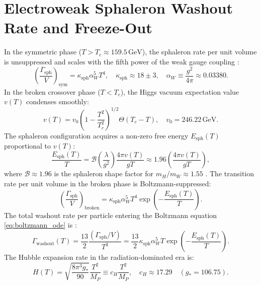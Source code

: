 \documentclass[11pt,a4paper]{article}
\begin{document}
\section{Electroweak Sphaleron Washout Rate and Freeze-Out}

In the symmetric phase ($T > T_c \approx 159.5\,\mathrm{GeV}$), the sphaleron rate per unit volume is unsuppressed and scales with the fifth power of the weak gauge coupling \cite{Bodeker2000,DOnofrio2014}:
\begin{equation}
\left( \frac{\Gamma_{\mathrm{sph}}}{V} \right)_{\mathrm{sym}} = \kappa_{\mathrm{sph}} \alpha_W^5 T^4, \quad \kappa_{\mathrm{sph}} \approx 18 \pm 3, \quad \alpha_W \equiv \frac{g^2}{4\pi} \approx 0.03380.
\label{eq:sph_sym}
\end{equation}
In the broken crossover phase ($T < T_c$), the Higgs vacuum expectation value $v(T)$ condenses smoothly:
\begin{equation}
v(T) = v_0 \left( 1 - \frac{T^2}{T_c^2} \right)^{1/2} \Theta(T_c - T), \quad v_0 = 246.22\,\mathrm{GeV}.
\label{eq:higgs_vev}
\end{equation}
The sphaleron configuration acquires a non-zero free energy $E_{\mathrm{sph}}(T)$ proportional to $v(T)$:
\begin{equation}
\frac{E_{\mathrm{sph}}(T)}{T} = \mathcal{B}\left(\frac{\lambda}{g^2}\right) \frac{4\pi v(T)}{g T} \approx 1.96 \left( \frac{4\pi v(T)}{g T} \right),
\label{eq:E_sph}
\end{equation}
where $\mathcal{B} \approx 1.96$ is the sphaleron shape factor for $m_H / m_W \approx 1.55$ \cite{Klinkhamer1984}. The transition rate per unit volume in the broken phase is Boltzmann-suppressed:
\begin{equation}
\left( \frac{\Gamma_{\mathrm{sph}}}{V} \right)_{\mathrm{broken}} = \kappa_{\mathrm{sph}} \alpha_W^5 T^4 \exp\left( - \frac{E_{\mathrm{sph}}(T)}{T} \right).
\end{equation}
The total washout rate per particle entering the Boltzmann equation \eqref{eq:boltzmann_ode} is \cite{Moore2000}:
\begin{equation}
\Gamma_{\mathrm{washout}}(T) = \frac{13}{2} \frac{(\Gamma_{\mathrm{sph}} / V)}{T^3} = \frac{13}{2} \kappa_{\mathrm{sph}} \alpha_W^5 T \exp\left( - \frac{E_{\mathrm{sph}}(T)}{T} \right).
\label{eq:gamma_washout}
\end{equation}
The Hubble expansion rate in the radiation-dominated era is:
\begin{equation}
H(T) = \sqrt{\frac{8\pi^3 g_*}{90}} \frac{T^2}{M_P} \equiv c_H \frac{T^2}{M_P}, \quad c_H \approx 17.29 \quad (g_* = 106.75).
\label{eq:hubble}
\end{equation}
\end{document}
